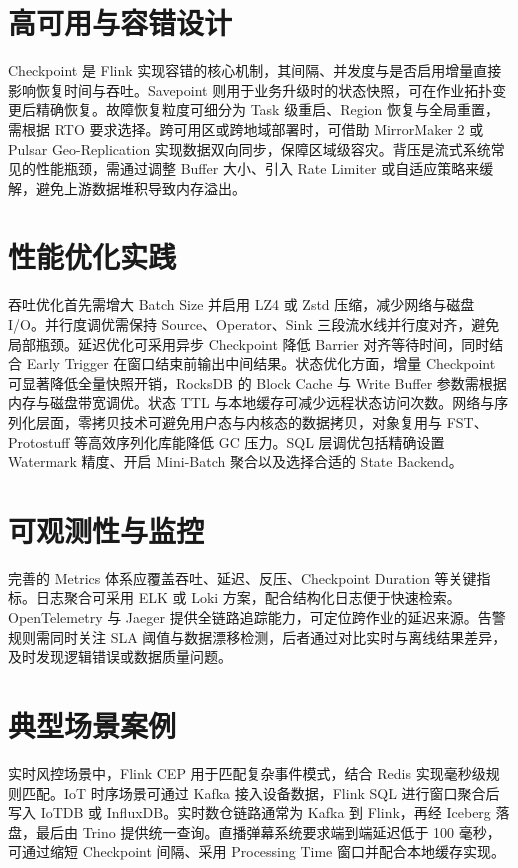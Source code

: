 \chapter{高可用与容错设计}
Checkpoint 是 Flink 实现容错的核心机制，其间隔、并发度与是否启用增量直接影响恢复时间与吞吐。Savepoint 则用于业务升级时的状态快照，可在作业拓扑变更后精确恢复。故障恢复粒度可细分为 Task 级重启、Region 恢复与全局重置，需根据 RTO 要求选择。跨可用区或跨地域部署时，可借助 MirrorMaker 2 或 Pulsar Geo-Replication 实现数据双向同步，保障区域级容灾。背压是流式系统常见的性能瓶颈，需通过调整 Buffer 大小、引入 Rate Limiter 或自适应策略来缓解，避免上游数据堆积导致内存溢出。\par
\chapter{性能优化实践}
吞吐优化首先需增大 Batch Size 并启用 LZ4 或 Zstd 压缩，减少网络与磁盘 I/O。并行度调优需保持 Source、Operator、Sink 三段流水线并行度对齐，避免局部瓶颈。延迟优化可采用异步 Checkpoint 降低 Barrier 对齐等待时间，同时结合 Early Trigger 在窗口结束前输出中间结果。状态优化方面，增量 Checkpoint 可显著降低全量快照开销，RocksDB 的 Block Cache 与 Write Buffer 参数需根据内存与磁盘带宽调优。状态 TTL 与本地缓存可减少远程状态访问次数。网络与序列化层面，零拷贝技术可避免用户态与内核态的数据拷贝，对象复用与 FST、Protostuff 等高效序列化库能降低 GC 压力。SQL 层调优包括精确设置 Watermark 精度、开启 Mini-Batch 聚合以及选择合适的 State Backend。\par
\chapter{可观测性与监控}
完善的 Metrics 体系应覆盖吞吐、延迟、反压、Checkpoint Duration 等关键指标。日志聚合可采用 ELK 或 Loki 方案，配合结构化日志便于快速检索。OpenTelemetry 与 Jaeger 提供全链路追踪能力，可定位跨作业的延迟来源。告警规则需同时关注 SLA 阈值与数据漂移检测，后者通过对比实时与离线结果差异，及时发现逻辑错误或数据质量问题。\par
\chapter{典型场景案例}
实时风控场景中，Flink CEP 用于匹配复杂事件模式，结合 Redis 实现毫秒级规则匹配。IoT 时序场景可通过 Kafka 接入设备数据，Flink SQL 进行窗口聚合后写入 IoTDB 或 InfluxDB。实时数仓链路通常为 Kafka 到 Flink，再经 Iceberg 落盘，最后由 Trino 提供统一查询。直播弹幕系统要求端到端延迟低于 100 毫秒，可通过缩短 Checkpoint 间隔、采用 Processing Time 窗口并配合本地缓存实现。\par
